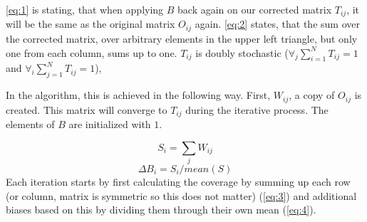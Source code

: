 
\eqref{eq:1} is stating, that when applying $B$ back again on our corrected
matrix $T_{ij}$, it will be the same as the original matrix $O_{ij}$ again.
\eqref{eq:2} states, that the sum over the corrected matrix, over arbitrary
elements in the upper left triangle, but only one from each column, sums up to
one. $T_{ij}$ is doubly stochastic ($\forall_j\sum^N_{i=1}T_{ij} = 1$ and
$\forall_i\sum^N_{j=1}T_{ij} = 1$), 


In the algorithm, this is achieved in the following way. First, $W_{ij}$, a
copy of $O_{ij}$ is created. This matrix will converge to $T_{ij}$ during the
iterative process. The elements of $B$ are initialized with $1$.


\begin{equation}\label{eq:3}
    S_i = \sum_j W_{ij}
\end{equation}
\begin{equation}\label{eq:4}
    \Delta B_i = S_i / mean(S)
\end{equation}
Each iteration starts by first calculating the coverage by summing up each row
(or column, matrix is symmetric so this does not matter) (\eqref{eq:3}) and
additional biases based on this by dividing them through their own mean
(\eqref{eq:4}).

